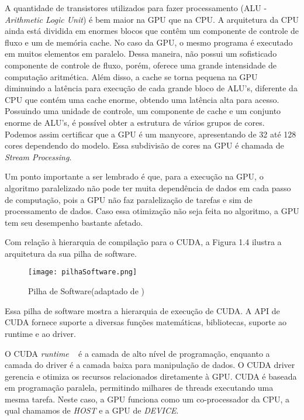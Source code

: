 A quantidade de transistores utilizados para fazer processamento (ALU - \textit{Arithmetic Logic Unit}) é bem maior na GPU que na CPU. A arquitetura da CPU ainda está dividida em enormes blocos que contêm um componente de controle de fluxo e um de memória cache. No caso da GPU, o mesmo programa é executado em muitos elementos em paralelo. Dessa maneira, não possui um sofisticado componente de controle de fluxo, porém, oferece uma grande intensidade de computação aritmética. Além disso, a cache se torna pequena na GPU diminuindo a latência para execução de cada grande bloco de ALU's, diferente da CPU que contém uma cache enorme, obtendo uma latência alta para acesso. Possuindo uma unidade de controle, um componente de cache e um conjunto enorme de ALU's, é possível obter a estrutura de vários grupos de
cores. Podemos assim certificar que a GPU é um manycore, apresentando de 32 até 128 cores dependendo do modelo. Essa subdivisão de cores na GPU é chamada de \textit{Stream Processing}.

Um ponto importante a ser lembrado é que, para a execução na GPU, o algoritmo paralelizado não pode ter muita dependência de dados em cada passo de computação, pois a GPU não faz paralelização de tarefas e sim de processamento de dados. Caso essa otimização não seja feita no algoritmo, a GPU tem seu desempenho bastante afetado.

Com relação à hierarquia de compilação para o CUDA, a Figura 1.4 ilustra a arquitetura da sua pilha de software.

\begin{figure}[!htb]
	\begin{center}
	\centering
			\texttt{[image: pilhaSoftware.png]}
	\label{fig: pilhaSoftware}
	\caption{Pilha de Software(adaptado de \cite{cuda})}
	\end{center}
\end{figure}

Essa pilha de software mostra a hierarquia de execução de CUDA. A API de CUDA fornece suporte a diversas funções matemáticas, bibliotecas, suporte ao runtime e ao driver.

O CUDA \textit{runtime} ~\cite{cuda} é a camada de alto nível de programação, enquanto a camada do driver é a camada baixa para manipulação de dados. O CUDA driver gerencia e otimiza os recursos relacionados diretamente à GPU. CUDA é baseada em programação paralela, permitindo milhares de threads executando uma mesma tarefa. Neste caso, a GPU funciona como um co-processador da CPU, a qual chamamos de \textit{HOST} e a GPU de \textit{DEVICE}.

